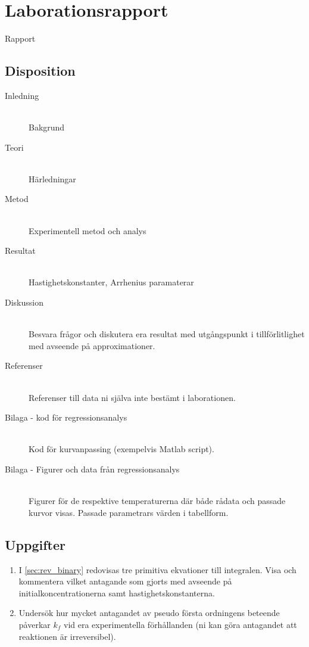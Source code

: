 \section{Laborationsrapport}
\label{sec:rapport}
Rapport

\subsection{Disposition}
\begin{description}
  \item[Inledning] \hfill \\ 
    Bakgrund
  \item[Teori] \hfill \\ 
    Härledningar
    \item[Metod] \hfill \\ 
      Experimentell metod och analys
    \item[Resultat] \hfill \\ 
      Hastighetskonstanter, Arrhenius paramaterar
    \item[Diskussion] \hfill \\ 
      Besvara frågor och diskutera era resultat med
      utgångspunkt i tillförlitlighet med avseende på
      approximationer.
    \item[Referenser] \hfill \\
      Referenser till data ni själva inte bestämt i laborationen.
    \item[Bilaga - kod för regressionsanalys] \hfill \\
      Kod för kurvanpassing (exempelvis Matlab script).
    \item[Bilaga - Figurer och data från regressionsanalys] \hfill \\
      Figurer för de respektive temperaturerna där både rådata och
      passade kurvor visas. Passade parametrars värden i tabellform.
\end{description}

\subsection{Uppgifter}
\begin{enumerate}
\item I \cref{sec:rev_binary} redovisas tre primitiva ekvationer till
integralen. Visa och kommentera vilket antagande som gjorts med avseende på
initialkoncentrationerna samt hastighetskonstanterna.
\item Undersök hur mycket antagandet av pseudo första ordningens beteende
  påverkar $k_f$ vid era experimentella förhållanden (ni kan göra
  antagandet att reaktionen är irreversibel).
\end{enumerate}


